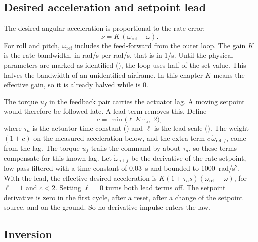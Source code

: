 \subsection{Desired acceleration and setpoint lead}

The desired angular acceleration is proportional to the rate error:
\begin{equation}\label{eq:inner_nu}
  \nu = K\,(\omega_{\mathrm{ref}} - \omega) .
\end{equation}
For roll and pitch, $\omega_{\mathrm{ref}}$ includes the feed-forward from the outer loop.
The gain $K$ is the rate bandwidth, in rad/s per rad/s, that is in 1/s.
Until the physical parameters are marked as identified (), the loop uses half of the set value.
This halves the bandwidth of an unidentified airframe.
In this chapter $K$ means the effective gain, so it is already halved while  is 0.

The torque $u_f$ in the feedback pair carries the actuator lag.
A moving setpoint would therefore be followed late.
A lead term removes this.
Define
\begin{equation}\label{eq:inner_lead}
  c = \min\!\bigl(\ell\,K\,\tau_a,\; 2\bigr) ,
\end{equation}
where $\tau_a$ is the actuator time constant () and $\ell$ is the lead scale ().
The weight $(1+c)$ on the measured acceleration below, and the extra term $c\,\dot\omega_{\mathrm{ref},f}$, come from the lag.
The torque $u_f$ trails the command by about $\tau_a$, so these terms compensate for this known lag.
Let $\dot\omega_{\mathrm{ref},f}$ be the derivative of the rate setpoint, low-pass filtered with a time constant of 0.03~s and bounded to 1000~rad/s$^2$.
With the lead, the effective desired acceleration is $K(1+\tau_a s)(\omega_{\mathrm{ref}}-\omega)$, for $\ell=1$ and $c<2$.
Setting $\ell=0$ turns both lead terms off.
The setpoint derivative is zero in the first cycle, after a reset, after a change of the setpoint source, and on the ground.
So no derivative impulse enters the law.

\subsection{Inversion}

